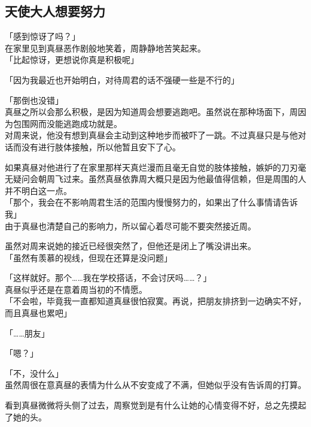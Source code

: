 \subsection{天使大人想要努力}

「感到惊讶了吗？」\\

在家里见到真昼恶作剧般地笑着，周静静地苦笑起来。\\

「比起惊讶，更想说你真是积极呢」

「因为我最近也开始明白，对待周君的话不强硬一些是不行的」

「那倒也没错」\\

真昼之所以会那么积极，是因为知道周会想要逃跑吧。虽然说在那种场面下，周因为包围网而没能逃跑成功就是。\\

对周来说，他没有想到真昼会主动到这种地步而被吓了一跳。不过真昼只是与他对话而没有进行肢体接触，所以他暂且安下了心。

如果真昼对他进行了在家里那样天真烂漫而且毫无自觉的肢体接触，嫉妒的刀刃毫无疑问会朝周飞过来。虽然真昼依靠周大概只是因为他最值得信赖，但是周围的人并不明白这一点。\\

「那个，我会在不影响周君生活的范围内慢慢努力的，如果出了什么事情请告诉我」\\

由于真昼也清楚自己的影响力，所以留心着尽可能不要突然接近周。

虽然对周来说她的接近已经很突然了，但他还是闭上了嘴没讲出来。\\

「虽然有羡慕的视线，但现在还算是没问题」

「这样就好。那个……我在学校搭话，不会讨厌吗……？」\\

真昼似乎还是在意着周当初的不情愿。\\

「不会啦，毕竟我一直都知道真昼很怕寂寞。再说，把朋友排挤到一边确实不好，而且真昼也累吧」

「……朋友」

「嗯？」

「不，没什么」\\

虽然周很在意真昼的表情为什么从不安变成了不满，但她似乎没有告诉周的打算。

看到真昼微微将头侧了过去，周察觉到是有什么让她的心情变得不好，总之先摸起了她的头。\\

